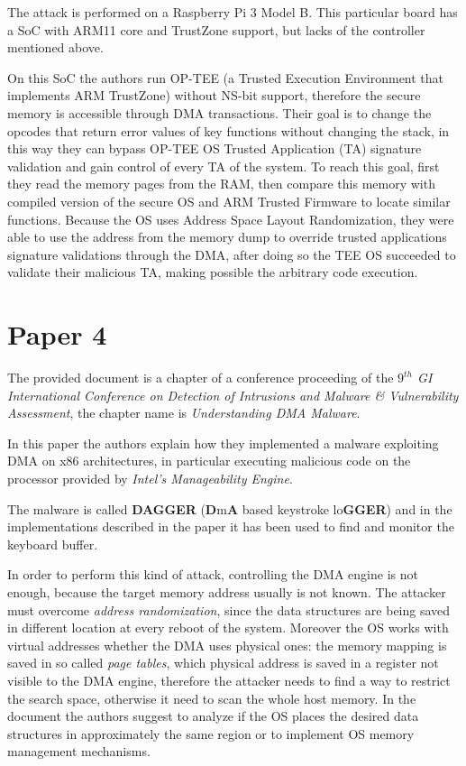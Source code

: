The attack is performed on a Raspberry Pi 3 Model B. This particular board has a SoC with ARM11 core and TrustZone support, but lacks of the controller mentioned above.

On this SoC the authors run OP-TEE (a Trusted Execution Environment that implements ARM TrustZone) without NS-bit support, therefore the secure memory is accessible through DMA transactions. Their goal is to change the opcodes that return error values of key functions without changing the stack, in this way they can bypass OP-TEE OS Trusted Application (TA) signature validation and gain control of every TA of the system. To reach this goal, first they read the memory pages from the RAM, then compare this memory with compiled version of the secure OS and ARM Trusted Firmware to locate similar functions. Because the OS uses Address Space Layout Randomization, they were able to use the address from the memory dump to override trusted applications signature validations through the DMA, after doing so the TEE OS succeeded to validate their malicious TA, making possible the arbitrary code execution.


\section{Paper 4}
The provided document is a chapter of a conference proceeding of the \emph{$9^{th}$ GI International Conference on Detection of Intrusions and Malware \& Vulnerability Assessment}, the chapter name is \emph{Understanding DMA Malware}\cite{10.1007/978-3-642-37300-8_2}.

In this paper the authors explain how they implemented a malware exploiting DMA on x86 architectures, in particular executing malicious code on the processor provided by \emph{Intel's Manageability Engine}.

The malware is called \textbf{DAGGER} (\textbf{D}m\textbf{A} based keystroke lo\textbf{GGER}) and in the implementations described in the paper it has been used to find and monitor the keyboard buffer.

In order to perform this kind of attack, controlling the DMA engine is not enough, because the target memory address usually is not known. The attacker must overcome \emph{address randomization}, since the data structures are being saved in different location at every reboot of the system. Moreover the OS works with virtual addresses whether the DMA uses physical ones: the memory mapping is saved in so called \emph{page tables}, which physical address is saved in a register not visible to the DMA engine, therefore the attacker needs to find a way to restrict the search space, otherwise it need to scan the whole host memory. In the document the authors suggest to analyze if the OS places the desired data structures in approximately the same region or to implement OS memory management mechanisms.


